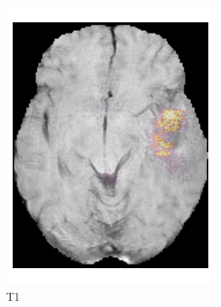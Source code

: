 \begin{figure}[htbp]
\begin{subfigure}[b]{\textwidth}
\begin{subfigure}[b]{0.24\textwidth}
        \includegraphics[width=\textwidth]{Figures/saliency_HGG_T1.png}
        \caption*{\acrshort{T1}\nopunct}
        \end{subfigure}
        \hfill
        \begin{subfigure}[b]{0.24\textwidth}

\end{subfigure}
\end{subfigure}
\end{figure}
